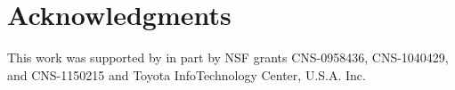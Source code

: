 
\section{Acknowledgments}

This work was supported by in part by NSF grants 
CNS-0958436, CNS-1040429, and CNS-1150215 and
Toyota InfoTechnology Center, U.S.A. Inc.

